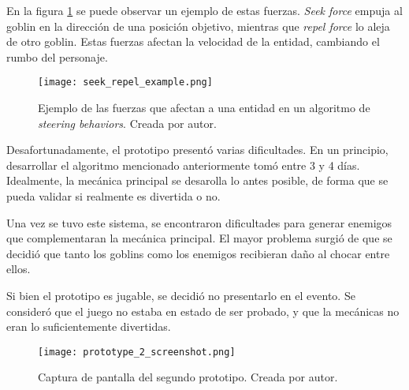 \par En la figura \ref{fig:x seek repel forces} se puede observar un ejemplo de estas fuerzas. \textit{Seek force} empuja al goblin en la dirección de una posición objetivo, mientras que \textit{repel force} lo aleja de otro goblin. Estas fuerzas afectan la velocidad de la entidad, cambiando el rumbo del personaje.
%
\begin{figure}[H]
  \centering
  \texttt{[image: seek\_repel\_example.png]}
  \caption{Ejemplo de las fuerzas que afectan a una entidad en un algoritmo de \textit{steering behaviors}. Creada por autor.}
  \label{fig:x seek repel forces} 
\end{figure}
%
\bigbreak
\par Desafortunadamente, el prototipo presentó varias dificultades. En un principio, desarrollar el algoritmo mencionado anteriormente tomó entre 3 y 4 días. Idealmente, la mecánica principal se desarolla lo antes posible, de forma que se pueda validar si realmente es divertida o no. 
\par Una vez se tuvo este sistema, se encontraron dificultades para generar enemigos que complementaran la mecánica principal. El mayor problema surgió de que se decidió que tanto los goblins como los enemigos recibieran daño al chocar entre ellos.
\par Si bien el prototipo es jugable, se decidió no presentarlo en el evento. Se consideró que el juego no estaba en estado de ser probado, y que la mecánicas no eran lo suficientemente divertidas.
%
\begin{figure}[H]
  \centering
  \texttt{[image: prototype\_2\_screenshot.png]}
  \caption{Captura de pantalla del segundo prototipo. Creada por autor.}
  \label{fig:x prototipo 2 godot} 
\end{figure}
%

